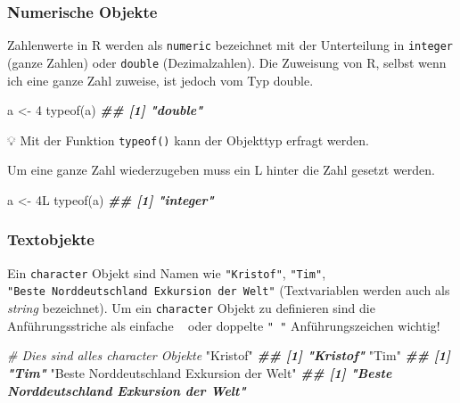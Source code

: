 \documentclass[
]{article}
\newenvironment{Shaded}{\begin{snugshade}}{\end{snugshade}}
\newcommand{\CommentTok}[1]{\textcolor[rgb]{0.56,0.35,0.01}{\textit{#1}}}
\newcommand{\DecValTok}[1]{\textcolor[rgb]{0.00,0.00,0.81}{#1}}
\newcommand{\DocumentationTok}[1]{\textcolor[rgb]{0.56,0.35,0.01}{\textbf{\textit{#1}}}}
\newcommand{\FunctionTok}[1]{\textcolor[rgb]{0.00,0.00,0.00}{#1}}
\newcommand{\NormalTok}[1]{#1}
\newcommand{\OtherTok}[1]{\textcolor[rgb]{0.56,0.35,0.01}{#1}}
\newcommand{\StringTok}[1]{\textcolor[rgb]{0.31,0.60,0.02}{#1}}
\begin{document}
\hypertarget{numerische-objekte}{%
\subsubsection{Numerische Objekte}\label{numerische-objekte}}

Zahlenwerte in R werden als \texttt{numeric} bezeichnet mit der Unterteilung in \texttt{integer} (ganze Zahlen) oder \texttt{double} (Dezimalzahlen). Die Zuweisung von R, selbst wenn ich eine ganze Zahl zuweise, ist jedoch vom Typ double.

\begin{Shaded}
\begin{Highlighting}[]
\NormalTok{a }\OtherTok{\textless{}{-}} \DecValTok{4}
\FunctionTok{typeof}\NormalTok{(a)}
\DocumentationTok{\#\# [1] "double"}
\end{Highlighting}
\end{Shaded}

💡 Mit der Funktion \texttt{typeof()} kann der Objekttyp erfragt werden.

Um eine ganze Zahl wiederzugeben muss ein L hinter die Zahl gesetzt werden.

\begin{Shaded}
\begin{Highlighting}[]
\NormalTok{a }\OtherTok{\textless{}{-}}\NormalTok{ 4L}
\FunctionTok{typeof}\NormalTok{(a)}
\DocumentationTok{\#\# [1] "integer"}
\end{Highlighting}
\end{Shaded}

\hypertarget{textobjekte}{%
\subsubsection{Textobjekte}\label{textobjekte}}

Ein \texttt{character} Objekt sind Namen wie \texttt{"Kristof"}, \texttt{"Tim"}, \texttt{"Beste\ Norddeutschland\ Exkursion\ der\ Welt"} (Textvariablen werden auch als \emph{string} bezeichnet). Um ein \texttt{character} Objekt zu definieren sind die Anführungsstriche als einfache \texttt{\textquotesingle{}\ \textquotesingle{}} oder doppelte \texttt{"\ "} Anführungszeichen wichtig!

\begin{Shaded}
\begin{Highlighting}[]
\CommentTok{\# Dies sind alles character Objekte }
\StringTok{"Kristof"}
\DocumentationTok{\#\# [1] "Kristof"}
\StringTok{"Tim"}
\DocumentationTok{\#\# [1] "Tim"}
\StringTok{"Beste Norddeutschland Exkursion der Welt"}
\DocumentationTok{\#\# [1] "Beste Norddeutschland Exkursion der Welt"}
\end{Highlighting}
\end{Shaded}
\end{document}
